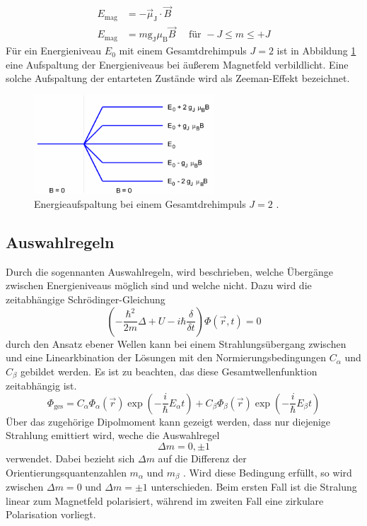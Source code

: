 \begin{align}
  E_\text{mag} &= -\vec{\mu}_\text{J} \cdot \vec{B} \\
  E_\text{mag} &= m \text{g}_\text{J} \mu_\text{B}\vec{B} \quad \text{ für } -J\leq m\leq+J
  \label{eqn:energie}
\end{align}
Für ein Energieniveau $E_0$ mit einem Gesamtdrehimpuls $J = \num{2}$ ist in Abbildung
\ref{abb:aufspaltung} eine Aufspaltung der Energieniveaus bei äußerem Magnetfeld
verbildlicht. Eine solche Aufspaltung der entarteten Zustände wird als Zeeman-Effekt
bezeichnet.
\begin{figure}[htb]
  \centering
  \includegraphics[width=0.6\textwidth]{images/V27_1.pdf}
  \caption{Energieaufspaltung bei einem Gesamtdrehimpuls $J = \num{2}$ \cite{anleitung}.}
  \label{abb:aufspaltung}
\end{figure}

\subsection{Auswahlregeln}
\label{sec:Auswahlregeln}
Durch die sogennanten Auswahlregeln, wird beschrieben, welche Übergänge zwischen
Energieniveaus möglich sind und welche nicht. Dazu wird die zeitabhängige
Schrödinger-Gleichung
\begin{equation}
  \left( -\frac{\hbar^2}{2m}\Delta+U-i\hbar \frac{\delta}{\delta t} \right)\Phi\left(\vec{r}, t \right) = 0
  \label{eqn:schroedinger}
\end{equation}
durch den Ansatz ebener Wellen kann bei einem Strahlungsübergang zwischen \alpha
und \beta eine Linearkbination der Lösungen mit den Normierungsbedingungen $C_\alpha$
und $C_\beta$ gebildet werden. Es ist zu beachten, das diese Gesamtwellenfunktion
zeitabhängig ist.
\begin{equation}
  \Phi_\text{ges} = C_\alpha \Phi_\alpha\left(\vec{r}\right)\exp{\left(-\frac{i}{\hbar}E_\alpha t\right)} + C_\beta \Phi_\beta\left(\vec{r}\right)\exp{\left(-\frac{i}{\hbar}E_\beta t\right)}
  \label{eqn:ebenewelle}
\end{equation}
Über das zugehörige Dipolmoment kann gezeigt werden, dass nur diejenige Strahlung
emittiert wird, weche die Auswahlregel
\begin{equation}
  \Delta m = 0, \pm 1
  \label{eqn:auswahl}
\end{equation}
verwendet. Dabei bezieht sich $\Delta m$ auf die Differenz der Orientierungsquantenzahlen
$m_\alpha$ und $m_\beta$ . Wird diese Bedingung erfüllt, so wird zwischen $\Delta m = 0$
und $\Delta m = \pm 1$ unterschieden. Beim ersten Fall ist die Stralung linear zum
Magnetfeld polarisiert, während im zweiten Fall eine zirkulare Polarisation vorliegt.


